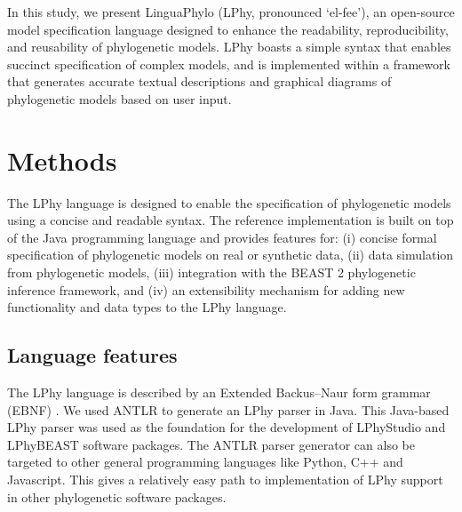 \documentclass[10pt,letterpaper,table]{article}
\theoremstyle{definition}
\begin{document}
In this study, we present LinguaPhylo (LPhy, pronounced `el-fee'), an open-source model specification language designed to enhance the readability, reproducibility, and reusability of phylogenetic models. LPhy boasts a simple syntax that enables succinct specification of complex models, and is implemented within a framework that generates accurate textual descriptions and graphical diagrams of phylogenetic models based on user input.

\section{Methods}
The LPhy language is designed to enable the specification of phylogenetic models using a concise and readable syntax.  
The reference implementation is built on top of the Java programming language and provides features for: 
(i) concise formal specification of phylogenetic models on real or synthetic data, (ii) data simulation from phylogenetic models, (iii) integration with the BEAST 2 phylogenetic inference framework, and (iv) an extensibility mechanism for adding new functionality and data types to the LPhy language.

\subsection{Language features}


The LPhy language is described by an Extended Backus–Naur form grammar (EBNF) \cite{ebnf}. 
We used ANTLR \cite{parr1995antlr,parr2013definitive} to generate an LPhy parser in Java. 
This Java-based LPhy parser was used as the foundation for the development of LPhyStudio and LPhyBEAST software packages. 
The ANTLR parser generator can also be targeted to other general programming languages like Python, C++ and Javascript. 
This gives a relatively easy path to implementation of LPhy support in other phylogenetic software packages.
\end{document}
